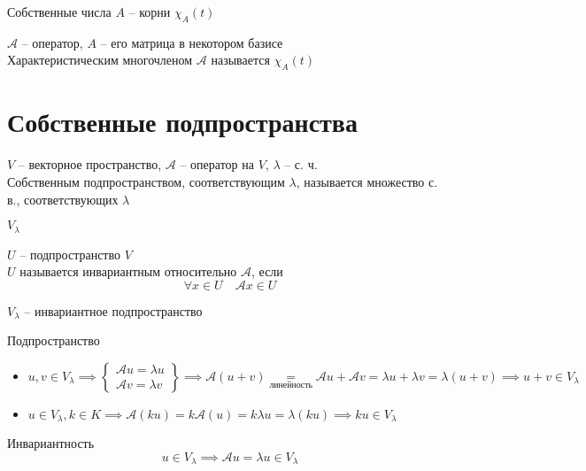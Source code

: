 \begin{theorem}
	Собственные числа $ A $ -- корни $ \chi_A(t) $
\end{theorem}

\begin{definition}
	$ \mathcal{A} $ -- оператор, $ A $ -- его матрица в некотором базисе \\
	Характеристическим многочленом $ \mathcal{A} $ называется $ \chi_A(t) $
\end{definition}

\section{Собственные подпространства}

\begin{definition}
	$ V $ -- векторное пространство, $ \mathcal{A} $ -- оператор на $ V $, $ \lambda $ -- с. ч. \\
	Собственным подпространством, соответствующим $ \lambda $, называется множество с. в., соответствующих $ \lambda $
\end{definition}

\begin{notation}
	$ V_\lambda $
\end{notation}

\begin{definition}
	$ U $ -- подпространство $ V $ \\
	$ U $ называется инвариантным относительно $ \mathcal{A} $, если
	$$ \forall x \in U \quad \mathcal{A}x \in U $$
\end{definition}

\begin{statement}
	$ V_\lambda $ -- инвариантное подпространство
\end{statement}

\begin{iproof}
	\item Подпространство
	\begin{itemize}
		\item $ u, v \in V_\lambda \implies
		\begin{Bmatrix}
			\mathcal{A}u = \lambda u \\
			\mathcal{A}v = \lambda v
		\end{Bmatrix} \implies \mathcal{A}(u + v) \underset{\text{линейность}}= \mathcal{A}u + \mathcal{A}v = \lambda u + \lambda v = \lambda (u + v) \implies u + v \in V_\lambda $
		\item $ u \in V_\lambda, k \in K \implies \mathcal{A}(ku) = k \mathcal{A}(u) = k \lambda u = \lambda(ku) \implies ku \in V_\lambda $
	\end{itemize}
	\item Инвариантность
	$$ u \in V_\lambda \implies \mathcal{A}u = \lambda u \in V_\lambda $$
\end{iproof}

